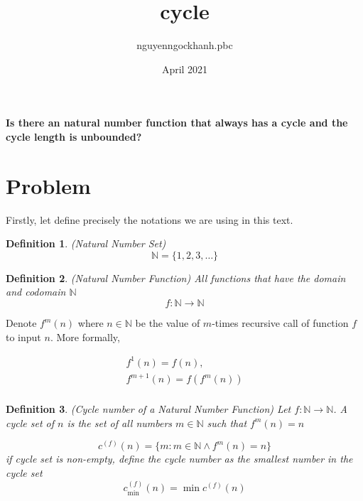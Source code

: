 \documentclass{article}
\title{cycle}
\author{nguyenngockhanh.pbc }
\date{April 2021}
\newtheorem{definition}{Definition}
\begin{document}
    \maketitle

    \textbf{Is there an natural number function that always has a cycle and the cycle length is unbounded?}


    \section{Problem}\label{sec:problem}

    Firstly, let define precisely the notations we are using in this text.

    \begin{definition}(Natural Number Set)
        \begin{equation}
            \label{eq:natural}
            \mathbb{N} = \{ 1, 2, 3, \dots \}
        \end{equation}
    \end{definition}

    \begin{definition}(Natural Number Function)
        All functions that have the domain and codomain $\mathbb{N}$
        \begin{equation}
            \label{eq:function}
            f: \mathbb{N} \to \mathbb{N}
        \end{equation}
    \end{definition}

    Denote $f^m(n)$ where $n \in \mathbb{N}$ be the value of $m$-times recursive call of function $f$ to input $n$.
    More formally,

    \begin{gather*}
        f^1(n) = f(n),\\
        f^{m+1}(n) = f(f^m(n))\\
    \end{gather*}


    \begin{definition}(Cycle number of a Natural Number Function)
        Let $f: \mathbb{N} \to \mathbb{N}$.
        A cycle set of $n$ is the set of all numbers $m \in \mathbb{N}$ such that $f^m(n) = n$

        \begin{equation}
            \label{eq:cycle_set}
            c^{(f)}(n) = \{m : m \in \mathbb{N} \land f^m(n) = n \}
        \end{equation}
        if cycle set is non-empty, define the cycle number as the smallest number in the cycle set
        \begin{equation}
            \label{eq:cycle_number}
            c^{(f)}_{\min}(n) = \min{c^{(f)}(n)}
        \end{equation}
    \end{definition}
\end{document}
